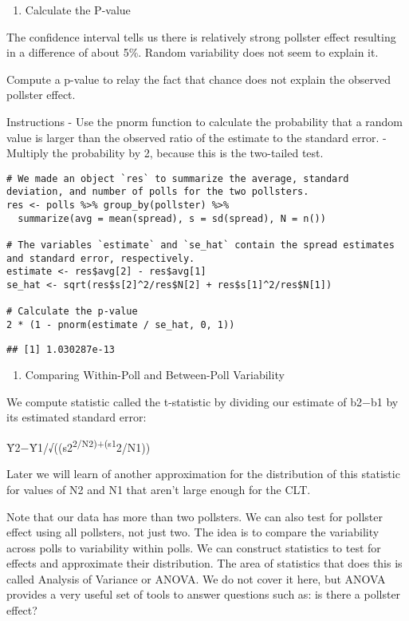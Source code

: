 \documentclass[
]{article}
\providecommand{\tightlist}{%
  \setlength{\itemsep}{0pt}\setlength{\parskip}{0pt}}
\begin{document}
\begin{enumerate}
\def\labelenumi{\arabic{enumi}.}
\setcounter{enumi}{15}
\tightlist
\item
  Calculate the P-value
\end{enumerate}

The confidence interval tells us there is relatively strong pollster
effect resulting in a difference of about 5\%. Random variability does
not seem to explain it.

Compute a p-value to relay the fact that chance does not explain the
observed pollster effect.

Instructions - Use the pnorm function to calculate the probability that
a random value is larger than the observed ratio of the estimate to the
standard error. - Multiply the probability by 2, because this is the
two-tailed test.

\begin{verbatim}
# We made an object `res` to summarize the average, standard deviation, and number of polls for the two pollsters.
res <- polls %>% group_by(pollster) %>% 
  summarize(avg = mean(spread), s = sd(spread), N = n()) 

# The variables `estimate` and `se_hat` contain the spread estimates and standard error, respectively.
estimate <- res$avg[2] - res$avg[1]
se_hat <- sqrt(res$s[2]^2/res$N[2] + res$s[1]^2/res$N[1])

# Calculate the p-value
2 * (1 - pnorm(estimate / se_hat, 0, 1))
\end{verbatim}

\begin{verbatim}
## [1] 1.030287e-13
\end{verbatim}

\begin{enumerate}
\def\labelenumi{\arabic{enumi}.}
\setcounter{enumi}{16}
\tightlist
\item
  Comparing Within-Poll and Between-Poll Variability
\end{enumerate}

We compute statistic called the t-statistic by dividing our estimate of
b2−b1 by its estimated standard error:

Ȳ2−Ȳ1/√((s2\textsuperscript{2/N2)+(s1}2/N1))

Later we will learn of another approximation for the distribution of
this statistic for values of N2 and N1 that aren't large enough for the
CLT.

Note that our data has more than two pollsters. We can also test for
pollster effect using all pollsters, not just two. The idea is to
compare the variability across polls to variability within polls. We can
construct statistics to test for effects and approximate their
distribution. The area of statistics that does this is called Analysis
of Variance or ANOVA. We do not cover it here, but ANOVA provides a very
useful set of tools to answer questions such as: is there a pollster
effect?
\end{document}
